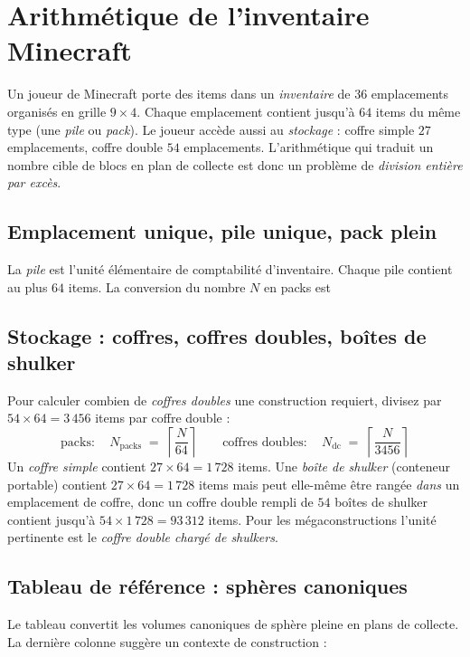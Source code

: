 \documentclass[12pt,a4paper]{scrartcl}
\begin{document}
\clearpage

\section{Arithmétique de l'inventaire Minecraft}

Un joueur de Minecraft porte des items dans un \emph{inventaire} de 36 emplacements organisés en grille $9 \times 4$. Chaque emplacement contient jusqu'à $64$ items du même type (une \emph{pile} ou \emph{pack}). Le joueur accède aussi au \emph{stockage} : coffre simple $27$ emplacements, coffre double $54$ emplacements. L'arithmétique qui traduit un nombre cible de blocs en plan de collecte est donc un problème de \emph{division entière par excès}.

\subsection{Emplacement unique, pile unique, pack plein}
La \emph{pile} est l'unité élémentaire de comptabilité d'inventaire. Chaque pile contient au plus $64$ items. La conversion du nombre $N$ en packs est

\subsection{Stockage : coffres, coffres doubles, boîtes de shulker}
Pour calculer combien de \emph{coffres doubles} une construction requiert, divisez par $54 \times 64 = 3\,456$ items par coffre double :
\[
\text{packs}:\quad N_{\mathrm{packs}} \;=\; \left\lceil \dfrac{N}{64} \right\rceil
\qquad
\text{coffres doubles}:\quad N_{\mathrm{dc}} \;=\; \left\lceil \dfrac{N}{3456} \right\rceil
\]
Un \emph{coffre simple} contient $27 \times 64 = 1\,728$ items. Une \emph{boîte de shulker} (conteneur portable) contient $27 \times 64 = 1\,728$ items mais peut elle-même être rangée \emph{dans} un emplacement de coffre, donc un coffre double rempli de $54$ boîtes de shulker contient jusqu'à $54 \times 1\,728 = 93\,312$ items. Pour les mégaconstructions l'unité pertinente est le \emph{coffre double chargé de shulkers}.

\subsection{Tableau de référence : sphères canoniques}
Le tableau convertit les volumes canoniques de sphère pleine en plans de collecte. La dernière colonne suggère un contexte de construction :
\nopagebreak
\end{document}
